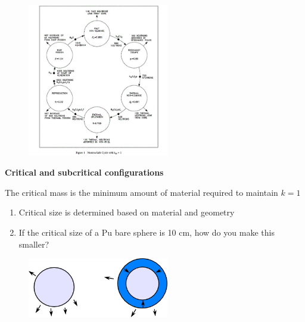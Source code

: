 \documentclass[aspectratio=1610,pdftex,dvipsnames,compress,xcolor={dvipsnames}]{beamer}
\begin{document}
\begin{frame}{}
    \begin{figure}
        \centering
        \includegraphics[width=0.55\textwidth]{neutron.generation.jpg}
    \end{figure}
\end{frame}


\begin{frame}[plain]{}
    \centering\LARGE\textbf{Critical and subcritical configurations}
\end{frame}


\addtocounter{framenumber}{-1} 
\begin{frame}{The critical mass is the minimum amount of material required to maintain $k = 1$}
    \begin{enumerate}[series=outerlist,topsep=0pt,itemsep=21pt,leftmargin=*,label=(\arabic*)]
        \item[]Critical size is determined based on material and geometry
        \item[]If the critical size of a Pu bare sphere is 10 cm, how do you make this smaller?
    \end{enumerate}

    \vspace*{\fill}

    \begin{figure}
        \centering
        \includegraphics[width=0.55\textwidth]{reflector.jpg}
    \end{figure}
\end{frame}
\end{document}

